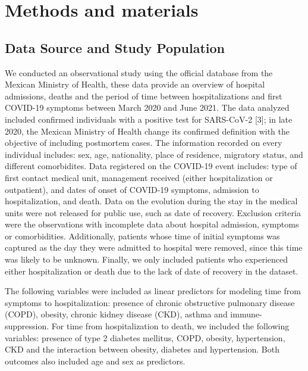 \documentclass[10pt,letterpaper]{article}
\begin{document}
\hypertarget{methods-and-materials}{%
\section{Methods and materials}\label{methods-and-materials}}

\hypertarget{data-source-and-study-population}{%
\subsection{Data Source and Study
Population}\label{data-source-and-study-population}}

We conducted an observational study using the official database from the
Mexican Ministry of Health, these data provide an overview of hospital
admissions, deaths and the period of time between hospitalizations and
first COVID-19 symptoms between March 2020 and June 2021. The data
analyzed included confirmed individuals with a positive test for
SARS-CoV-2 {[}3{]}; in late 2020, the Mexican Ministry of Health change
its confirmed definition with the objective of including postmortem
cases. The information recorded on every individual includes: sex, age,
nationality, place of residence, migratory status, and different
comorbidites. Data registered on the COVID-19 event includes: type of
first contact medical unit, management received (either hospitalization
or outpatient), and dates of onset of COVID-19 symptoms, admission to
hospitalization, and death. Data on the evolution during the stay in the
medical units were not released for public use, such as date of
recovery. Exclusion criteria were the observations with incomplete data
about hospital admission, symptoms or comorbidities. Additionally,
patients whose time of initial symptoms was captured as the day they
were admitted to hospital were removed, since this time was likely to be
unknown. Finally, we only included patients who experienced either
hospitalization or death due to the lack of date of recovery in the
dataset.

The following variables were included as linear predictors for modeling
time from symptoms to hospitalization: presence of chronic obstructive
pulmonary disease (COPD), obesity, chronic kidney disease (CKD), asthma
and immune-suppression. For time from hospitalization to death, we
included the following variables: presence of type 2 diabetes mellitus,
COPD, obesity, hypertension, CKD and the interaction between obesity,
diabetes and hypertension. Both outcomes also included age and sex as
predictors.
\end{document}
